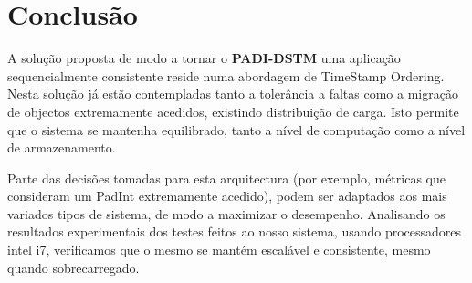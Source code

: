 \section{Conclusão}

A solução proposta de modo a tornar o \textbf{PADI-DSTM} uma aplicação sequencialmente consistente reside numa abordagem de TimeStamp Ordering\cite{ex1}. Nesta solução já estão contempladas tanto a tolerância a faltas como a migração de objectos extremamente acedidos, existindo distribuição de carga. Isto permite que o sistema se mantenha equilibrado, tanto a nível de computação como a nível de armazenamento. 

Parte das decisões tomadas para esta arquitectura (por exemplo, métricas que consideram um PadInt extremamente acedido), podem ser adaptados aos mais variados tipos de sistema, de modo a maximizar o desempenho. Analisando os resultados experimentais dos testes feitos ao nosso sistema, usando processadores intel i7, verificamos que o mesmo se mantém escalável e consistente, mesmo quando sobrecarregado. 
